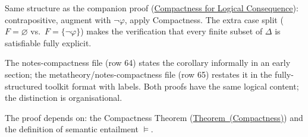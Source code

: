 \begin{remark*}
Same structure as the companion proof
(\hyperref[prf:compactness-consequence-old]{Compactness for Logical Consequence}):
contrapositive, augment with $\neg\varphi$, apply Compactness. The extra case
split ($F = \varnothing$ vs.\ $F = \{\neg\varphi\}$) makes the verification
that every finite subset of $\Delta$ is satisfiable fully explicit.
\end{remark*}

\begin{remark*}
The notes-compactness file (row 64) states the corollary informally in an
early section; the metatheory/notes-compactness file (row 65) restates it in
the fully-structured toolkit format with labels. Both proofs have the same
logical content; the distinction is organisational.
\end{remark*}

\begin{remark*}[Dependencies]
The proof depends on: the Compactness Theorem
(\hyperref[thm:compactness]{Theorem~(Compactness)}) and the definition of
semantic entailment $\models$.
\end{remark*}
